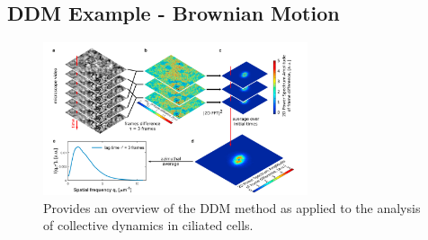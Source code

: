 \documentclass[11pt]{article}
\begin{document}
\subsection{DDM Example - Brownian Motion}

\begin{figure}[H]
\centering
\includegraphics[height=4.5cm]{images/ddmpic.png}
\caption{Provides an overview of the DDM method as applied to the analysis of collective dynamics in ciliated cells.\cite{ddm2}}
\end{figure}
\end{document}
